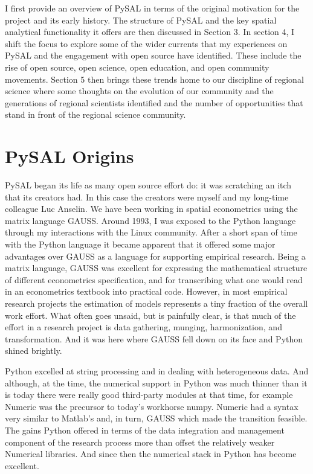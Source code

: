 \documentclass[11pt]{article}
\begin{document}
I first provide an overview of PySAL in terms of the original motivation for
the project and its early history. The structure of PySAL and the key spatial
analytical functionality it offers are then discussed in Section 3. In section
4, I shift the focus to explore some of the wider currents that my experiences
on PySAL and the engagement with open source have identified. These include the
rise of open source, open science, open education, and open community
movements. Section 5 then brings these trends home to our discipline of
regional science where some thoughts on the evolution of our community and the
generations of regional scientists identified and the number of opportunities
that stand in front of the regional science community.

\section*{PySAL Origins}
\label{sec:org5c752ab}
PySAL began its life as many open source effort do: it was scratching
an itch that its creators had. In this case the creators were myself and my
long-time colleague Luc Anselin. We have been working in spatial econometrics
using the matrix language GAUSS. Around 1993, I was exposed to the Python
language through my interactions with the Linux community. After a short span of
time with the Python language it became apparent that it offered some major
advantages over GAUSS as a language for supporting empirical research. Being a
matrix language, GAUSS was excellent for expressing the mathematical structure
of different econometrics specification, and for transcribing what one would
read in an econometrics textbook into practical code. However, in most empirical
research projects the estimation of models represents a tiny fraction of the
overall work effort. What often goes unsaid, but is painfully clear, is that
much of the effort in a research project is data gathering, munging,
harmonization, and transformation. And it was here where GAUSS fell down on its
face and Python shined brightly.

Python excelled at string processing and in dealing with heterogeneous data.
And although, at the time, the numerical support in Python was much thinner
than it is today there were really good third-party modules at that time, for
example Numeric was the precursor to today's workhorse numpy. Numeric had a
syntax very similar to Matlab's and, in turn, GAUSS which made the transition
feasible. The gains Python offered in terms of the data integration and management
component of the research process more than offset the relatively weaker
Numerical libraries. And since then the numerical stack in Python has become
excellent.
\end{document}
